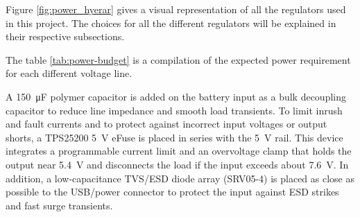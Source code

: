 \documentclass[11pt]{article}
\begin{document}
Figure \ref{fig:power_hyerar} gives a visual representation of all the regulators used in this 
project. The choices for all the different regulators will be explained in their respective subsections.

The table \ref{tab:power-budget} is a compilation of the expected 
power requirement for each different voltage line. 

A \SI{150}{\micro\farad} polymer capacitor is added on the battery input as a bulk decoupling 
capacitor to reduce line impedance and smooth load transients. To limit inrush and fault currents 
and to protect against incorrect input voltages or output shorts, a TPS25200 \SI{5}{\volt} eFuse is 
placed in series with the \SI{5}{\volt} rail. This device integrates a programmable current limit 
and an overvoltage clamp that holds the output near \SI{5.4}{\volt} and disconnects the load if the 
input exceeds about \SI{7.6}{\volt}. In addition, a low-capacitance TVS/ESD diode array (SRV05-4) is 
placed as close as possible to the USB/power connector to protect the input against ESD strikes and 
fast surge transients.
\end{document}
